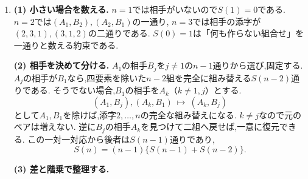 \begin{enumerate}[label=\textbf{問\arabic*.},leftmargin=3.8em,format=\bookitemlink{practice-entrance}{solution}{problem}]
                  初期値と更新の係数から全項が整数である.
                  $u_2=6>u_1=3$であり,$u_{n+1}>u_n>0$なら$u_{n+2}>2u_{n+1}>u_{n+1}$となるため,
                  $n\ge1$で正値と厳密な増加が続く.
                  隣接する二項から作る
                  \[
                    I_n=u_n^2+u_{n+1}^2-3u_nu_{n+1}
                  \]
                  に更新式を入れると,
                  \[
                  \begin{aligned}
                    I_{n+1}&=u_{n+1}^2+(3u_{n+1}-u_n)^2\\
                           &\quad-3u_{n+1}(3u_{n+1}-u_n)=I_n.
                  \end{aligned}
                  \]
                  よって$I_n=I_0=-9$から$(3,u_n,u_{n+1})$は正の整数解となる.
                  増加するため解は互いに異なり,無限個得られる.ここでは全解の分類まではしていない.
                  最後に$0<\beta<1<\alpha$と$P,Q>0$から,
                  \[
                    \frac{u_{n+1}}{u_n}
                      =\alpha\,\cfrac{P+Q(\frac\beta\alpha)^{n+1}}
                                       {P+Q(\frac\beta\alpha)^n}
                      \longrightarrow\alpha.
                  \]
                  更新式は整数性を保証し,は整数の比が近づく無理数を示している.
          \item \textbf{(1) 小さい場合を数える.}
                  $n=1$では相手がいないので$S(1)=0$である.
                  $n=2$では$(A_1,B_2),(A_2,B_1)$の一通り,
                  $n=3$では相手の添字が$(2,3,1),(3,1,2)$の二通りである.
                  $S(0)=1$は「何も作らない組合せ」を一通りと数える約束である.
                  \par\smallskip\textbf{(2) 相手を決めて分ける.}
                  $A_1$の相手$B_j$を$j\ne1$の$n-1$通りから選び,固定する.
                  $A_j$の相手が$B_1$なら,四要素を除いた$n-2$組を完全に組み替える$S(n-2)$通りである.
                  そうでない場合,$B_1$の相手を$A_k$（$k\ne1,j$）とする.
                  \[
                    (A_1,B_j),(A_k,B_1)\ \longmapsto\ (A_k,B_j)
                  \]
                  として$A_1,B_1$を除けば,添字$2,\ldots,n$の完全な組み替えになる.
                  $k\ne j$なので元のペアは増えない.
                  逆に$B_j$の相手$A_k$を見つけて二組へ戻せば,一意に復元できる.
                  この一対一対応から後者は$S(n-1)$通りであり,
                  \[
                    S(n)=(n-1)\{S(n-1)+S(n-2)\}.
                  \]
                  \par\smallskip\textbf{(3) 差と階乗で整理する.}

\end{enumerate}
